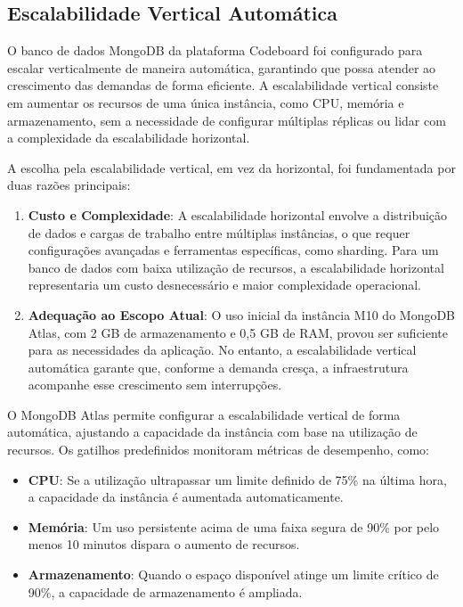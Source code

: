 \subsection{Escalabilidade Vertical Automática}

O banco de dados MongoDB da plataforma Codeboard foi configurado para escalar verticalmente de maneira automática, garantindo que possa atender ao crescimento das demandas de forma eficiente. A escalabilidade vertical consiste em aumentar os recursos de uma única instância, como CPU, memória e armazenamento, sem a necessidade de configurar múltiplas réplicas ou lidar com a complexidade da escalabilidade horizontal.

A escolha pela escalabilidade vertical, em vez da horizontal, foi fundamentada por duas razões principais:
\begin{enumerate}
    \item \textbf{Custo e Complexidade}: A escalabilidade horizontal envolve a distribuição de dados e cargas de trabalho entre múltiplas instâncias, o que requer configurações avançadas e ferramentas específicas, como sharding. Para um banco de dados com baixa utilização de recursos, a escalabilidade horizontal representaria um custo desnecessário e maior complexidade operacional.
    \item \textbf{Adequação ao Escopo Atual}: O uso inicial da instância M10 do MongoDB Atlas, com 2 GB de armazenamento e 0,5 GB de RAM, provou ser suficiente para as necessidades da aplicação. No entanto, a escalabilidade vertical automática garante que, conforme a demanda cresça, a infraestrutura acompanhe esse crescimento sem interrupções.
\end{enumerate}

O MongoDB Atlas permite configurar a escalabilidade vertical de forma automática, ajustando a capacidade da instância com base na utilização de recursos. Os gatilhos predefinidos monitoram métricas de desempenho, como:
\begin{itemize}
    \item \textbf{CPU}: Se a utilização ultrapassar um limite definido de 75\% na última hora, a capacidade da instância é aumentada automaticamente.
    \item \textbf{Memória}: Um uso persistente acima de uma faixa segura de 90\% por pelo menos 10 minutos dispara o aumento de recursos.
    \item \textbf{Armazenamento}: Quando o espaço disponível atinge um limite crítico de 90\%, a capacidade de armazenamento é ampliada. 
\end{itemize}


